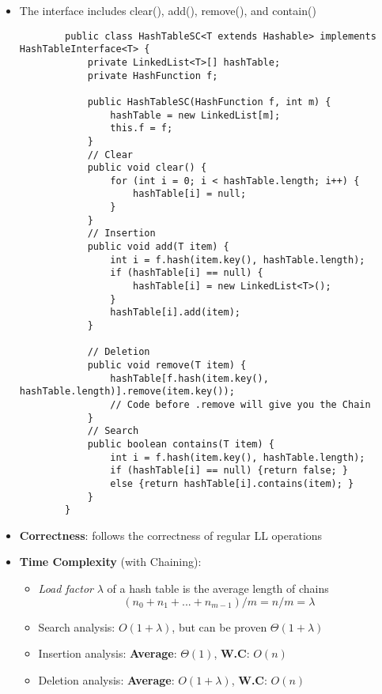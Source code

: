 \documentclass[10pt, 
a4paper, 
oneside, 
headinclude, footinclude, 
BCOR5mm]
{scrartcl}
\begin{document}
\begin{itemize}
    \item The interface includes clear(), add(), remove(), and contain()
    \begin{lstlisting}
        public class HashTableSC<T extends Hashable> implements HashTableInterface<T> {
            private LinkedList<T>[] hashTable;
            private HashFunction f;

            public HashTableSC(HashFunction f, int m) {
                hashTable = new LinkedList[m];
                this.f = f;
            }
            // Clear 
            public void clear() {
                for (int i = 0; i < hashTable.length; i++) {
                    hashTable[i] = null;
                }
            }
            // Insertion 
            public void add(T item) {
                int i = f.hash(item.key(), hashTable.length);
                if (hashTable[i] == null) {
                    hashTable[i] = new LinkedList<T>();
                }
                hashTable[i].add(item);
            }

            // Deletion
            public void remove(T item) {
                hashTable[f.hash(item.key(), hashTable.length)].remove(item.key());
                // Code before .remove will give you the Chain
            }
            // Search
            public boolean contains(T item) {
                int i = f.hash(item.key(), hashTable.length);
                if (hashTable[i] == null) {return false; }
                else {return hashTable[i].contains(item); }
            }
        }
    \end{lstlisting}
    \item \textbf{Correctness}: follows the correctness of regular LL operations
    \item \textbf{Time Complexity} (with Chaining):
    \begin{itemize}
        \item \textit{Load factor} $\lambda$ of a hash table is the average length of chains $$(n_0+n_1+...+n_{m-1})/m = n/m = \lambda$$
        \item Search analysis: $O(1+\lambda)$, but can be proven $\Theta(1+\lambda)$ 
        \item Insertion analysis: \textbf{Average}: $\Theta(1)$, \textbf{W.C}: $O(n)$
        \item Deletion analysis: \textbf{Average}: $O(1+\lambda)$, \textbf{W.C}: $O(n)$
    \end{itemize}
\end{itemize}
\end{document}
